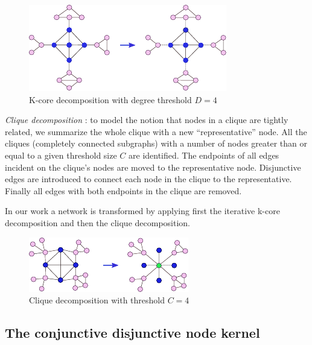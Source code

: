\documentclass[review]{elsarticle}
\begin{document}
\begin{figure}
\centering
\includegraphics[width=.9\textwidth]{k_core}
\caption{K-core decomposition with degree threshold $D = 4$}
\label{fig:kcore-decomposition}
\end{figure}

\textit{Clique decomposition} \cite{tarjan1985decomposition}: to model the notion that nodes in a clique are tightly related, we summarize the whole clique with a new ``representative'' node. All the cliques (completely connected subgraphs) with a number of nodes greater than or equal to a given threshold size $C$ are identified. The endpoints of all edges incident on the clique's nodes are moved to the representative node. Disjunctive edges are introduced to connect each node in the clique to the representative. Finally all edges with both endpoints in the clique are removed.

In our work a network is transformed by applying first the iterative k-core decomposition and then the clique decomposition.

\begin{figure}
\centering
\includegraphics[width=.9\textwidth]{cliques.pdf}
\caption{Clique decomposition with threshold $C = 4$}
\label{fig:clique-decomposition}
\end{figure}

\subsection{The conjunctive disjunctive node kernel}
\end{document}
